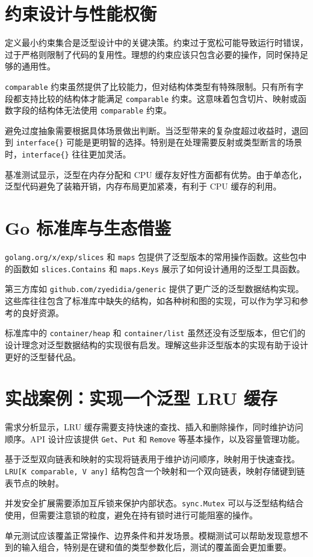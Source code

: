 \chapter{约束设计与性能权衡}
定义最小约束集合是泛型设计中的关键决策。约束过于宽松可能导致运行时错误，过于严格则限制了代码的复用性。理想的约束应该只包含必要的操作，同时保持足够的通用性。\par
\texttt{comparable} 约束虽然提供了比较能力，但对结构体类型有特殊限制。只有所有字段都支持比较的结构体才能满足 \texttt{comparable} 约束。这意味着包含切片、映射或函数字段的结构体无法使用 \texttt{comparable} 约束。\par
避免过度抽象需要根据具体场景做出判断。当泛型带来的复杂度超过收益时，退回到 \texttt{interface\{{}\}{}} 可能是更明智的选择。特别是在处理需要反射或类型断言的场景时，\texttt{interface\{{}\}{}} 往往更加灵活。\par
基准测试显示，泛型在内存分配和 CPU 缓存友好性方面都有优势。由于单态化，泛型代码避免了装箱开销，内存布局更加紧凑，有利于 CPU 缓存的利用。\par
\chapter{Go 标准库与生态借鉴}
\texttt{golang.org/x/exp/slices} 和 \texttt{maps} 包提供了泛型版本的常用操作函数。这些包中的函数如 \texttt{slices.Contains} 和 \texttt{maps.Keys} 展示了如何设计通用的泛型工具函数。\par
第三方库如 \texttt{github.com/zyedidia/generic} 提供了更广泛的泛型数据结构实现。这些库往往包含了标准库中缺失的结构，如各种树和图的实现，可以作为学习和参考的良好资源。\par
标准库中的 \texttt{container/heap} 和 \texttt{container/list} 虽然还没有泛型版本，但它们的设计理念对泛型数据结构的实现很有启发。理解这些非泛型版本的实现有助于设计更好的泛型替代品。\par
\chapter{实战案例：实现一个泛型 LRU 缓存}
需求分析显示，LRU 缓存需要支持快速的查找、插入和删除操作，同时维护访问顺序。API 设计应该提供 \texttt{Get}、\texttt{Put} 和 \texttt{Remove} 等基本操作，以及容量管理功能。\par
基于泛型双向链表和映射的实现将链表用于维护访问顺序，映射用于快速查找。\texttt{LRU[K comparable, V any]} 结构包含一个映射和一个双向链表，映射存储键到链表节点的映射。\par
并发安全扩展需要添加互斥锁来保护内部状态。\texttt{sync.Mutex} 可以与泛型结构结合使用，但需要注意锁的粒度，避免在持有锁时进行可能阻塞的操作。\par
单元测试应该覆盖正常操作、边界条件和并发场景。模糊测试可以帮助发现意想不到的输入组合，特别是在键和值的类型参数化后，测试的覆盖面会更加重要。\par

